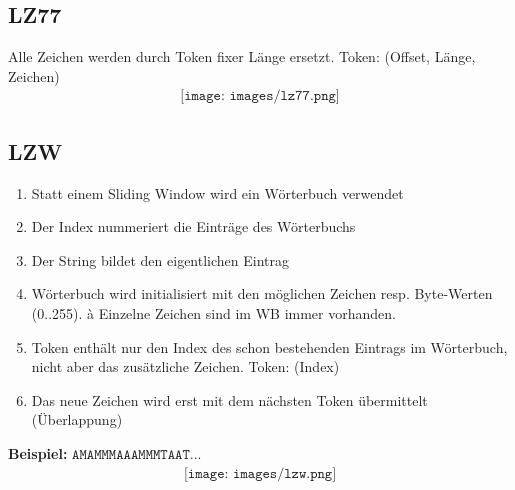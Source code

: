 \subsection{LZ77}
Alle Zeichen werden durch Token fixer Länge ersetzt. Token: (Offset, Länge, Zeichen)
\begin{align*}
    \texttt{[image: images/lz77.png]}
\end{align*}

\subsection{LZW}
\begin{enumerate}
    \item Statt einem Sliding Window wird ein Wörterbuch verwendet
    \item Der Index nummeriert die Einträge des Wörterbuchs
    \item Der String bildet den eigentlichen Eintrag
    \item Wörterbuch wird initialisiert mit den möglichen Zeichen resp. Byte-Werten (0..255). à Einzelne Zeichen sind im WB immer vorhanden.
    \item Token enthält nur den Index des schon bestehenden Eintrags im Wörterbuch, nicht aber das zusätzliche Zeichen. Token: (Index)
    \item Das neue Zeichen wird erst mit dem nächsten Token übermittelt (Überlappung)
\end{enumerate}
\textbf{Beispiel: } $\mathtt{A M A M M M A A A M M M T A A T ...}$
\begin{align*}
    \texttt{[image: images/lzw.png]}
\end{align*}
